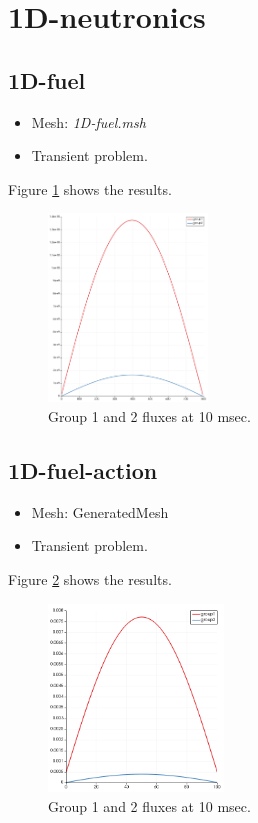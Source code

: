 \documentclass[11pt,letterpaper]{article}
\begin{document}
\section{1D-neutronics}

\subsection{1D-fuel}

	\begin{itemize}
		\item Mesh: \textit{1D-fuel.msh}
		\item Transient problem.
	\end{itemize}

Figure \ref{fig:1D-fuel} shows the results.

	\begin{figure}[htbp!]
		\centering
		\includegraphics[height=5cm]{1D-fuel}
		\caption{Group 1 and 2 fluxes at 10 msec.}
		\label{fig:1D-fuel}
	\end{figure}

\subsection{1D-fuel-action}

	\begin{itemize}
		\item Mesh: GeneratedMesh
		\item Transient problem.
	\end{itemize}

Figure \ref{fig:1D-fuel-action} shows the results.

	\begin{figure}[htbp!]
		\centering
		\includegraphics[height=5cm]{1D-fuel-action}
		\caption{Group 1 and 2 fluxes at 10 msec.}
		\label{fig:1D-fuel-action}
	\end{figure}
\end{document}
